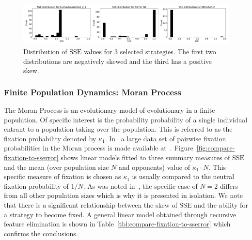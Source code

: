\documentclass[a4paper]{article}
\newcommand{\SSe}{\text{SSE}}
\begin{document}
\begin{figure}[!hbtp]
    \centering
    \includegraphics[width=\textwidth]{./assets/img/sserror_distribution_for_selection_of_strategies/main.pdf}
    \caption{Distribution of \(\SSe\) values for 3 selected strategies. The
    first two distributions are negatively skewed and the third has a positive
    skew.}
    \label{fig:sserror_distribution_for_selection_of_strategies}
\end{figure}

\subsubsection{Finite Population Dynamics: Moran Process}

The Moran Process is an evolutionary model of evolutionary in a finite
population. Of specific interest is the probability probability of a single 
individual entrant to a population taking over the population.
This is referred to as the fixation probability denoted by \(\kappa_1\).
In~\cite{Moran1707} a large data set of pairwise fixation probabilities in the
Moran process is made available at~\cite{vincent_knight_2017_1040129}.
Figure~\ref{fig:compare-fixation-to-sserror} shows linear models fitted to three
summary measures of \(\SSe\) and the mean (over population size \(N\) and
opponents) value of \(\kappa_1\cdot N\). This
specific measure of fixation is chosen as \(\kappa_1\) is usually compared to
the neutral fixation probability of \(1 / N\).  As was noted
in~\cite{Moran1707}, the specific case of \(N=2\) differs from all other
population sizes which is why it is presented in isolation.  We note that there
is a significant relationship between the skew of \(\SSe\) and the ability for a
strategy to become fixed.  A general linear model obtained through recursive
feature elimination is shown in Table~\ref{tbl:compare-fixation-to-sserror}
which confirms the conclusions.
\end{document}
